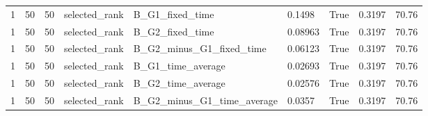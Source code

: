 \begin{longtable}{lllllllll}
1 & 50 & 50 & selected\_rank & B\_G1\_fixed\_time & 0.1498 & True & 0.3197 & 70.76 \\
1 & 50 & 50 & selected\_rank & B\_G2\_fixed\_time & 0.08963 & True & 0.3197 & 70.76 \\
1 & 50 & 50 & selected\_rank & B\_G2\_minus\_G1\_fixed\_time & 0.06123 & True & 0.3197 & 70.76 \\
1 & 50 & 50 & selected\_rank & B\_G1\_time\_average & 0.02693 & True & 0.3197 & 70.76 \\
1 & 50 & 50 & selected\_rank & B\_G2\_time\_average & 0.02576 & True & 0.3197 & 70.76 \\
1 & 50 & 50 & selected\_rank & B\_G2\_minus\_G1\_time\_average & 0.0357 & True & 0.3197 & 70.76 \\
\bottomrule
\end{longtable}
\endgroup
